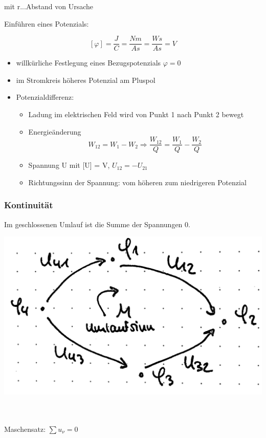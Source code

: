  mit r...Abstand von Ursache

Einführen eines Potenzials: 

$$ [\varphi] = \frac{J}{C} = \frac{Nm}{As} = \frac{Ws}{As} = V$$

\begin{itemize}
	\item willkürliche Festlegung eines Bezugspotenzials $\varphi = 0$
	\item im Stromkreis höheres Potenzial am Pluspol
	\item Potenzialdifferenz:
		\begin{itemize}
			\item Ladung im elektrischen Feld wird von Punkt 1 nach Punkt 2 bewegt
			\item Energieänderung 
				$$W_{12} = W_1 - W_2 \Rightarrow \frac{W_{12}}{Q} = \frac{W_1}{Q} - \frac{W_2}{Q}$$
			\item Spannung U mit [U] = V, $U_{12} = -U_{21}$ 
			\item Richtungssinn der Spannung: vom höheren zum niedrigeren Potenzial
		\end{itemize}
\end{itemize}

\subsubsection{Kontinuität}

Im geschlossenen Umlauf ist die Summe der Spannungen 0.

\begin{minipage}{0.5\textwidth}
	\includegraphics[width=\textwidth]{img/2_4}
\end{minipage} \hfill
\begin{minipage}{0.5\textwidth}	
	\\\\
	Maschensatz: $\sum u_\nu = 0$
\end{minipage}

